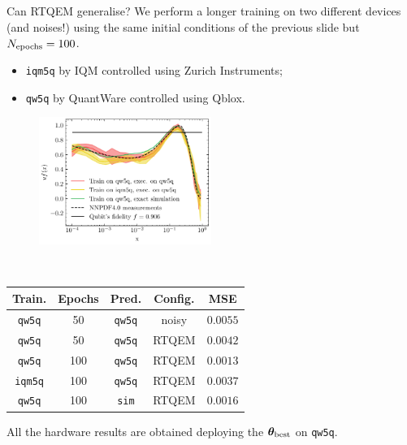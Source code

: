 \documentclass[8pt, xcolor={svgnames}, hyperref={linkcolor=black}]{beamer}
\begin{document}
\begin{frame}{Can RTQEM generalise?}
We perform a longer training on two different devices (and noises!) using the same 
initial conditions of the previous slide but $N_{\rm epochs}=100$. 

\begin{itemize}[noitemsep]
    \item[\faTerminal]\texttt{iqm5q} by IQM controlled using Zurich Instruments;
    \item[\faTerminal]\texttt{qw5q} by QuantWare controlled using Qblox.
\end{itemize}


\begin{multicols}{2}

\begin{figure}
    \includegraphics[width=0.5\textwidth]{figures/benchs.pdf}%
\end{figure}

\texttt{\\}
\begin{center}
\footnotesize
\begin{table}
\begin{tabular}{ccccc}
\hline \hline 
\textbf{Train.} & \textbf{Epochs} & \textbf{Pred.} &  \textbf{Config.} & MSE \\
\hline    
\texttt{qw5q} & 50 & \texttt{qw5q} & noisy & $0.0055$  \\     
\texttt{qw5q} & 50 & \texttt{qw5q} & RTQEM & $0.0042$ \\ 
\hline 
\texttt{qw5q} & 100 & \texttt{qw5q} & RTQEM & $0.0013$  \\     
\texttt{iqm5q} & 100 & \texttt{qw5q} & RTQEM & $0.0037$ \\   
\texttt{qw5q} & 100& \texttt{sim} & RTQEM & $0.0016$ \\   
\hline \hline
\end{tabular}
\centering
\end{table}
\end{center}


\end{multicols}

All the hardware results are obtained deploying the $\bm{\theta}_{\rm best}$ on 
\texttt{qw5q}.
\end{frame}
\end{document}
